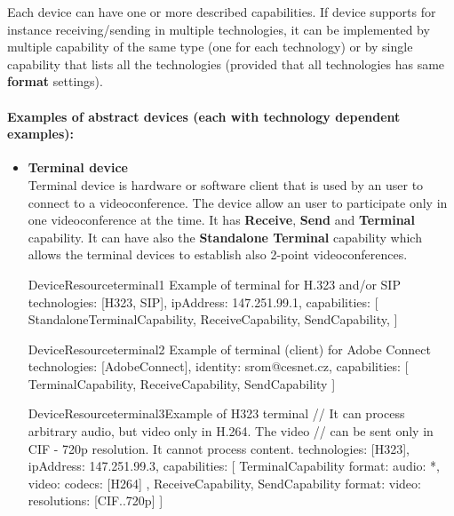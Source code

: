 Each device can have one or more described capabilities. If device supports 
for instance receiving/sending in multiple technologies, it can be implemented 
by multiple capability of the same type (one for each technology) or by single 
capability that lists all the technologies (provided that all technologies has 
same \textbf{format} settings).

\paragraph{Examples of abstract devices (each with technology dependent 
           examples):}

\begin{itemize}

\item \textbf{Terminal device} \\
  Terminal device is hardware or software client that is used by an user to 
  connect to a videoconference. The device allow an user to participate only 
  in one videoconference at the time. It has \textbf{Receive}, \textbf{Send} 
  and \textbf{Terminal} capability. It can have also the 
  \textbf{Standalone Terminal} capability which allows the terminal devices to  
  establish also 2-point videoconferences. 
  
\begin{EntityExample}{DeviceResource}{terminal1}%
      {Example of terminal for H.323 and/or SIP}
technologies: [H323, SIP],
ipAddress: 147.251.99.1,
capabilities: [
  StandaloneTerminalCapability,
  ReceiveCapability,
  SendCapability, 
]
\end{EntityExample}

\begin{EntityExample}{DeviceResource}{terminal2}%
      {Example of terminal (client) for Adobe Connect}
technologies: [AdobeConnect],
identity: srom@cesnet.cz,
capabilities: [
  TerminalCapability,
  ReceiveCapability,
  SendCapability
]
\end{EntityExample}

\begin{EntityExample}{DeviceResource}{terminal3}{Example of H323 terminal}
// It can process arbitrary audio, but video only in H.264. The video
// can be sent only in CIF - 720p resolution. It cannot process content.
technologies: [H323],
ipAddress: 147.251.99.3,
capabilities: [
  TerminalCapability {
    format: {
      audio: *,
      video: {codecs: [H264]}
    }
  },
  ReceiveCapability,
  SendCapability {
    format: {
      video: {resolutions: [CIF..720p]}
    }
  }
]
\end{EntityExample}


\end{itemize}
